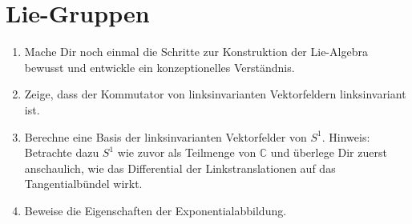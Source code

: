 \documentclass[a4paper]{scrartcl}
\begin{document}
	\section{Lie-Gruppen}
	\begin{enumerate}
		\item Mache Dir noch einmal die Schritte zur Konstruktion der Lie-Algebra bewusst und entwickle ein konzeptionelles Verständnis.
		\item Zeige, dass der Kommutator von linksinvarianten Vektorfeldern linksinvariant ist.
		\item Berechne eine Basis der linksinvarianten Vektorfelder von $S^1$. Hinweis: Betrachte dazu $S^1$ wie zuvor als Teilmenge von $\mathbb{C}$ und überlege Dir zuerst anschaulich, wie das Differential der Linkstranslationen auf das Tangentialbündel wirkt.
		\item Beweise die Eigenschaften der Exponentialabbildung.
	\end{enumerate}
\end{document}
